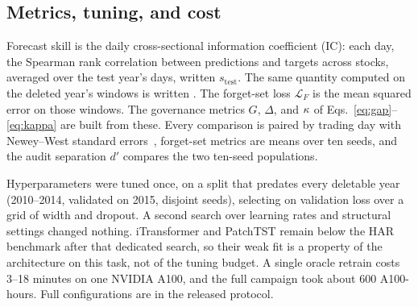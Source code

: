 \subsection{Metrics, tuning, and cost}

Forecast skill is the daily cross-sectional information coefficient
(IC): each day, the Spearman rank correlation between predictions and
targets across stocks, averaged over the test year's days,
written $s_{\text{test}}$. The same quantity computed on the deleted
year's windows is written \forgetic{}. The forget-set loss
$\mathcal{L}_F$ is the mean squared error on those windows. The
governance metrics $G$, $\Delta$, and $\kappa$ of
Eqs.~\ref{eq:gap}--\ref{eq:kappa} are built from these. Every
comparison is paired by trading day with Newey--West standard
errors~\cite{newey1987hac}, forget-set metrics are means over ten
seeds, and the audit separation $d'$ compares the two ten-seed
populations.

Hyperparameters were tuned once, on a split that predates every
deletable year (2010--2014, validated on 2015, disjoint seeds),
selecting on validation loss over a grid of width and dropout. A second search over learning rates and structural
settings changed nothing. iTransformer and
PatchTST remain below the HAR benchmark after that dedicated search,
so their weak fit is a property of the architecture on this task, not
of the tuning budget. A single oracle retrain costs 3--18 minutes on
one NVIDIA A100, and the full campaign took about 600 A100-hours.
Full configurations are in the released protocol.
